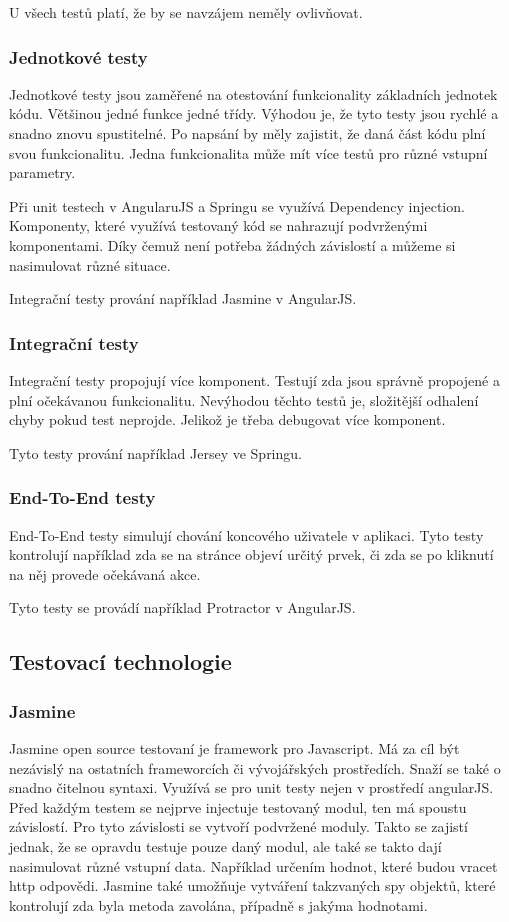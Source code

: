 \documentclass[czech,master,public,dept460,male,cpdeclaration,twoside]{diploma}
\begin{document}
U všech testů platí, že by se navzájem neměly ovlivňovat.

\subsubsection{Jednotkové testy}
Jednotkové testy jsou zaměřené na otestování funkcionality základních jednotek kódu. Většinou jedné funkce jedné třídy. Výhodou je, že tyto testy jsou rychlé a snadno znovu spustitelné. Po napsání by měly zajistit, že daná část kódu plní svou funkcionalitu. Jedna funkcionalita může mít více testů pro různé vstupní parametry.

Při unit testech v AngularuJS a Springu se využívá Dependency injection. Komponenty, které využívá testovaný kód se nahrazují podvrženými komponentami. Díky čemuž není potřeba žádných závislostí a můžeme si nasimulovat různé situace.

Integrační testy prování například Jasmine v AngularJS.

\subsubsection{Integrační testy}
Integrační testy propojují více komponent. Testují zda jsou správně propojené a plní očekávanou funkcionalitu. Nevýhodou těchto testů je, složitější odhalení chyby pokud test neprojde. Jelikož je třeba debugovat více komponent. 

Tyto testy prování například Jersey ve Springu.

\subsubsection{End-To-End testy}
End-To-End testy simulují chování koncového uživatele v aplikaci. Tyto testy kontrolují například zda se na stránce objeví určitý prvek, či zda se po kliknutí na něj provede očekávaná akce.

Tyto testy se provádí například Protractor v AngularJS.

\subsection{Testovací technologie}
\subsubsection{Jasmine}
Jasmine open source testovaní je framework pro Javascript. Má za cíl být nezávislý na ostatních frameworcích či vývojářských prostředích. Snaží se také o snadno čitelnou syntaxi. Využívá se pro unit testy nejen v prostředí angularJS. Před každým testem se nejprve injectuje testovaný modul, ten má spoustu závislostí. Pro tyto závislosti se vytvoří podvržené moduly. Takto se zajistí jednak, že se opravdu testuje pouze daný modul, ale také se takto dají nasimulovat různé vstupní data. Například určením hodnot, které budou vracet http odpovědi. Jasmine také umožňuje vytváření takzvaných spy objektů, které kontrolují zda byla metoda zavolána, případně s jakýma hodnotami.
\end{document}
